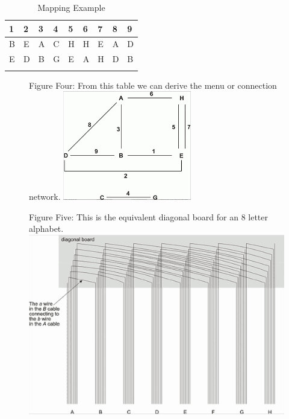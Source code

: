\documentclass[12pt,a4paper]{article}
\begin{document}
\label{Crib and Ciphertext}
\begin{longtable}{ |p{1.25cm}|p{1.25cm}|p{1.25cm}|p{1.25cm}|p{1.25cm}|p{1.25cm}|p{1.25cm}|p{1.25cm}|p{1.25cm}| }\hline
1 & 2 & 3 & 4 & 5 & 6 & 7 & 8 & 9 \\ \hline\hline
B & E & A & C & H & H & E & A & D \\ \hline
E & D & B & G & E & A & H & D & B \\ \hline
\caption{Mapping Example}
\end{longtable}

\begin{figure}[h]
\centering
Figure Four: 
From this table we can derive the menu or connection network.
\includegraphics[width=0.5\textwidth]{BOMBEone.png}
\end{figure}

\begin{figure}[h]
\centering
Figure Five: 
This is the equivalent diagonal board for an 8 letter alphabet.
\includegraphics[width=\textwidth]{BOMBEtwo.png}
\end{figure}
\end{document}
